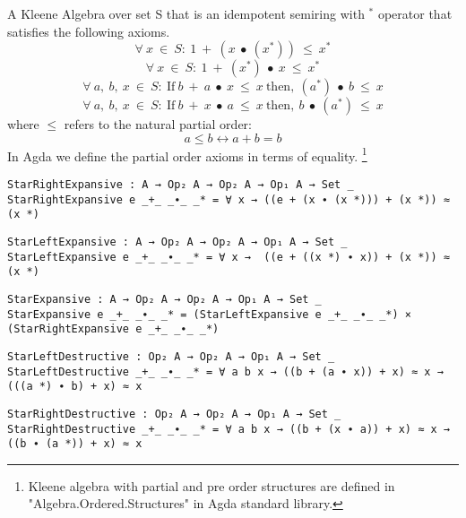 A Kleene Algebra over set S that is an idempotent semiring with $^{*}$
operator that satisfies the following axioms.
\begin{equation}\label{eq_starrightexpansive}
\forall\ x\ \in\ S:\ 1\ +\ (x\ ∙\ (x^{*}))\ \leq\ x^{*}
\end{equation}
\begin{equation}\label{eq_starleftexpansive}
\forall\ x\ \in\ S:\ 1\ +\ (x^{*})\ ∙\ x\ \leq\ x^{*}
\end{equation}
\begin{equation}\label{eq_starleftdestructive}
\forall\ a,\ b,\ x\ \in\ S:\ \text{If} \ b\ +\ a\  ∙\ x\ \leq\ x\ \text{then},\ (a^{*})\ ∙\ b\ \leq\ x
\end{equation}
\begin{equation}\label{eq_starrightdestructive}
\forall\ a,\ b,\ x\ \in\ S:\ \text{If} \ b\ +\ x\ ∙\ a\ \leq\ x \  \text{then},\ b\ ∙\ (a^{*})\ \leq\ x
\end{equation}
where $\leq$ refers to the natural partial order: 
\[a \leq b \leftrightarrow a + b = b\] In Agda we define the partial order
axioms in terms of equality. \footnote{Kleene algebra with partial and pre order
structures are defined in "Algebra.Ordered.Structures" in Agda standard
library.}
\begin{verbatim}
StarRightExpansive : A → Op₂ A → Op₂ A → Op₁ A → Set _
StarRightExpansive e _+_ _∙_ _* = ∀ x → ((e + (x ∙ (x *))) + (x *)) ≈ (x *)
\end{verbatim}
\begin{verbatim}
StarLeftExpansive : A → Op₂ A → Op₂ A → Op₁ A → Set _
StarLeftExpansive e _+_ _∙_ _* = ∀ x →  ((e + ((x *) ∙ x)) + (x *)) ≈ (x *)
\end{verbatim}
\begin{verbatim}
StarExpansive : A → Op₂ A → Op₂ A → Op₁ A → Set _
StarExpansive e _+_ _∙_ _* = (StarLeftExpansive e _+_ _∙_ _*) × (StarRightExpansive e _+_ _∙_ _*)
\end{verbatim}
\begin{verbatim}
StarLeftDestructive : Op₂ A → Op₂ A → Op₁ A → Set _
StarLeftDestructive _+_ _∙_ _* = ∀ a b x → ((b + (a ∙ x)) + x) ≈ x → (((a *) ∙ b) + x) ≈ x
\end{verbatim}
\begin{verbatim}
StarRightDestructive : Op₂ A → Op₂ A → Op₁ A → Set _
StarRightDestructive _+_ _∙_ _* = ∀ a b x → ((b + (x ∙ a)) + x) ≈ x → ((b ∙ (a *)) + x) ≈ x
\end{verbatim}
